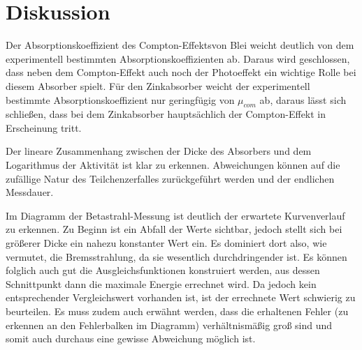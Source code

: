 \section{Diskussion}
\label{sec:Diskussion}

Der Absorptionskoeffizient des Compton-Effektsvon Blei weicht deutlich von dem experimentell bestimmten Absorptionskoeffizienten ab.
Daraus wird geschlossen, dass neben dem Compton-Effekt auch noch der Photoeffekt ein wichtige Rolle bei diesem Absorber spielt. Für
den Zinkabsorber weicht der experimentell bestimmte Absorptionskoeffizient nur geringfügig von $\mu_{com}$ ab, daraus
lässt sich schließen, dass bei dem Zinkabsorber hauptsächlich der Compton-Effekt in Erscheinung tritt. 

Der lineare Zusammenhang zwischen der Dicke des Absorbers und dem Logarithmus der Aktivität ist klar zu erkennen.
Abweichungen können auf die zufällige Natur des Teilchenzerfalles zurückgeführt werden und der endlichen Messdauer.

Im Diagramm der Betastrahl-Messung ist deutlich der erwartete Kurvenverlauf zu erkennen. Zu Beginn ist ein Abfall der
Werte sichtbar, jedoch stellt sich bei größerer Dicke ein nahezu konstanter Wert ein. Es dominiert dort also, wie vermutet, die Bremsstrahlung, da
sie wesentlich durchdringender ist. Es können folglich auch gut die Ausgleichsfunktionen konstruiert werden, aus dessen Schnittpunkt
dann die maximale Energie errechnet wird. Da jedoch kein entsprechender Vergleichswert vorhanden ist, ist der errechnete Wert schwierig
zu beurteilen. Es muss zudem auch erwähnt werden, dass die erhaltenen Fehler (zu erkennen an den Fehlerbalken im Diagramm) verhältnismäßig
groß sind und somit auch durchaus eine gewisse Abweichung möglich ist.
